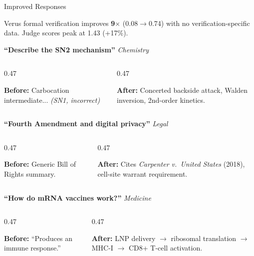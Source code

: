   \begin{block}{Improved Responses}

    Verus formal verification improves \textcolor{cardinal}{\textbf{9$\times$}} (0.08$\to$0.74) with no verification-specific data. Judge scores peak at 1.43 (+17\%).

    \vspace{-0.3em}
    {\small\textbf{``Describe the SN2 mechanism''} \hfill \textit{Chemistry}}
    \vspace{-0.5em}
    \begin{columns}[T]
    \begin{column}{0.47\colwidth}
    \colorbox{cRed!10}{\parbox{\dimexpr\linewidth-2\fboxsep}{\small\textcolor{cRed}{\textbf{Before:}} Carbocation intermediate... \textit{(SN1, incorrect)}}}
    \end{column}
    \begin{column}{0.47\colwidth}
    \colorbox{cGreen!10}{\parbox{\dimexpr\linewidth-2\fboxsep}{\small\textcolor{cGreen!50!black}{\textbf{After:}} Concerted backside attack, Walden inversion, 2nd-order kinetics.}}
    \end{column}
    \end{columns}

    \vspace{0.2em}
    {\small\textbf{``Fourth Amendment and digital privacy''} \hfill \textit{Legal}}
    \vspace{-0.5em}
    \begin{columns}[T]
    \begin{column}{0.47\colwidth}
    \colorbox{cRed!10}{\parbox{\dimexpr\linewidth-2\fboxsep}{\small\textcolor{cRed}{\textbf{Before:}} Generic Bill of Rights summary.}}
    \end{column}
    \begin{column}{0.47\colwidth}
    \colorbox{cGreen!10}{\parbox{\dimexpr\linewidth-2\fboxsep}{\small\textcolor{cGreen!50!black}{\textbf{After:}} Cites \textit{Carpenter v.\ United States} (2018), cell-site warrant requirement.}}
    \end{column}
    \end{columns}

    \vspace{0.2em}
    {\small\textbf{``How do mRNA vaccines work?''} \hfill \textit{Medicine}}
    \vspace{-0.5em}
    \begin{columns}[T]
    \begin{column}{0.47\colwidth}
    \colorbox{cRed!10}{\parbox{\dimexpr\linewidth-2\fboxsep}{\small\textcolor{cRed}{\textbf{Before:}} ``Produces an immune response.''}}
    \end{column}
    \begin{column}{0.47\colwidth}
    \colorbox{cGreen!10}{\parbox{\dimexpr\linewidth-2\fboxsep}{\small\textcolor{cGreen!50!black}{\textbf{After:}} LNP delivery $\to$ ribosomal translation $\to$ MHC-I $\to$ CD8+ T-cell activation.}}
    \end{column}
    \end{columns}

  \end{block}


